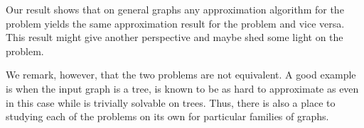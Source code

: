 Our result shows that on general graphs any approximation algorithm for
the \Problem{} problem yields the same approximation result for the 
\ProblemGroup{} problem and vice versa.
This result might give another perspective and maybe shed some light on
the \ProblemGroup{} problem.

We remark, however, that the two problems are not equivalent.
A good example is when the input graph is a tree, \ProbGroup{} is known to 
be as hard to approximate as \ProbSetCover{} even in this case while \Prob{} is 
trivially solvable on trees.
Thus, there is also a place to studying each of the problems on its own for particular 
families of graphs.